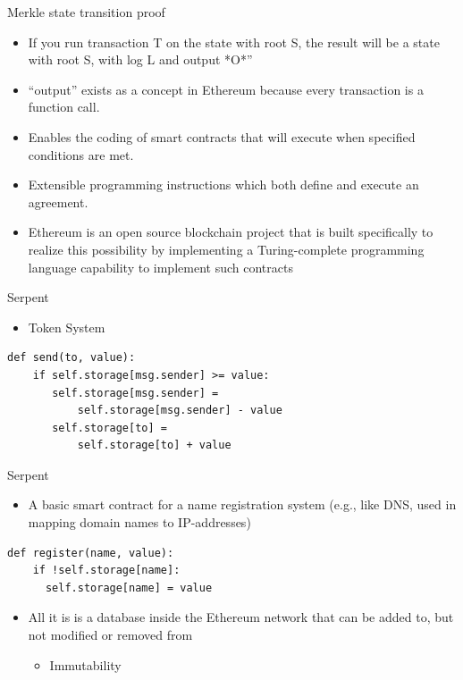 \documentclass[presentation]{beamer}
\begin{document}
\begin{frame}[label=sec-5-6]{Merkle state transition proof}
\begin{itemize}
\item If you run transaction \alert{T} on the state with root \alert{S}, the result will be a state with root \alert{S}, with log \alert{L} and output *O*”
\item “output” exists as a concept in Ethereum because every transaction is a function call.

\item Enables the coding of \alert{smart contracts} that will execute when specified conditions are met.
\item \alert{Extensible programming instructions} which both define and execute an agreement.
\item Ethereum is an open source blockchain project that is built specifically to realize this possibility by implementing a \alert{Turing-complete} programming language capability to implement such contracts
\end{itemize}
\end{frame}

\begin{frame}[fragile,label=sec-5-7]{Serpent}
 \begin{itemize}
\item Token System
\end{itemize}

\begin{verbatim}
def send(to, value):
    if self.storage[msg.sender] >= value:
       self.storage[msg.sender] =
	       self.storage[msg.sender] - value
       self.storage[to] =
	       self.storage[to] + value
\end{verbatim}
\end{frame}

\begin{frame}[fragile,label=sec-5-8]{Serpent}
 \begin{itemize}
\item A basic smart contract for a name registration system (e.g., like DNS, used in mapping domain names to IP-addresses)
\end{itemize}

\begin{verbatim}
def register(name, value):
    if !self.storage[name]:
      self.storage[name] = value
\end{verbatim}
\begin{itemize}
\item All it is is a \alert{database inside the Ethereum network} that can be added to, but not modified or removed from
\begin{itemize}
\item \alert{Immutability}
\end{itemize}
\end{itemize}
\end{frame}
\end{document}
